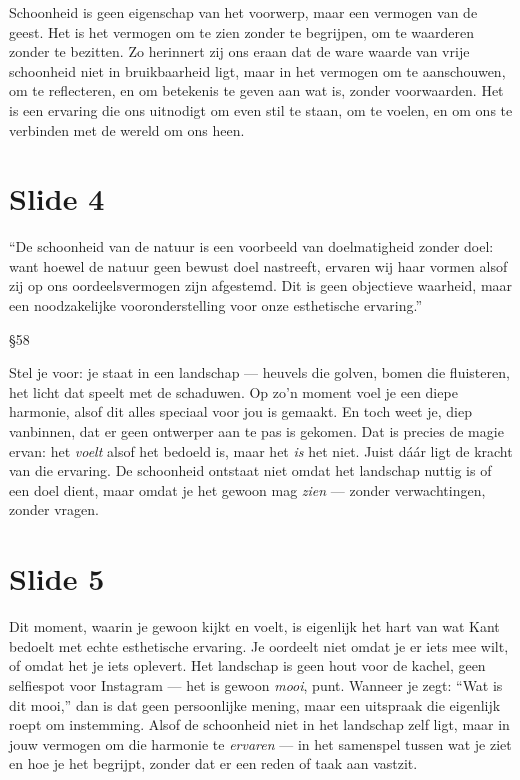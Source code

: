 \documentclass{article}
\begin{document}
Schoonheid is geen eigenschap van het voorwerp, maar een vermogen van de geest. Het is het vermogen om te zien zonder te begrijpen, om te waarderen zonder te bezitten. Zo herinnert zij ons eraan dat de ware waarde van vrije schoonheid niet in bruikbaarheid ligt, maar in het vermogen om te aanschouwen, om te reflecteren, en om betekenis te geven aan wat is, zonder voorwaarden. Het is een ervaring die ons uitnodigt om even stil te staan, om te voelen, en om ons te verbinden met de wereld om ons heen.

\section*{Slide 4}

\epigraph{``De schoonheid van de natuur is een voorbeeld van doelmatigheid zonder doel: want hoewel de natuur geen bewust doel nastreeft, ervaren wij haar vormen alsof zij op ons oordeelsvermogen zijn afgestemd. Dit is geen objectieve waarheid, maar een noodzakelijke vooronderstelling voor onze esthetische ervaring.''}{§58}

Stel je voor: je staat in een landschap --- heuvels die golven, bomen die fluisteren, het licht dat speelt met de schaduwen. Op zo'n moment voel je een diepe harmonie, alsof dit alles speciaal voor jou is gemaakt. En toch weet je, diep vanbinnen, dat er geen ontwerper aan te pas is gekomen. Dat is precies de magie ervan: het \textit{voelt} alsof het bedoeld is, maar het \textit{is} het niet. Juist dáár ligt de kracht van die ervaring. De schoonheid ontstaat niet omdat het landschap nuttig is of een doel dient, maar omdat je het gewoon mag \textit{zien} --- zonder verwachtingen, zonder vragen.

\section*{Slide 5}

Dit moment, waarin je gewoon kijkt en voelt, is eigenlijk het hart van wat Kant bedoelt met echte esthetische ervaring. Je oordeelt niet omdat je er iets mee wilt, of omdat het je iets oplevert. Het landschap is geen hout voor de kachel, geen selfiespot voor Instagram --- het is gewoon \textit{mooi}, punt. Wanneer je zegt: ``Wat is dit mooi,'' dan is dat geen persoonlijke mening, maar een uitspraak die eigenlijk roept om instemming. Alsof de schoonheid niet in het landschap zelf ligt, maar in jouw vermogen om die harmonie te \textit{ervaren} --- in het samenspel tussen wat je ziet en hoe je het begrijpt, zonder dat er een reden of taak aan vastzit.
\end{document}
